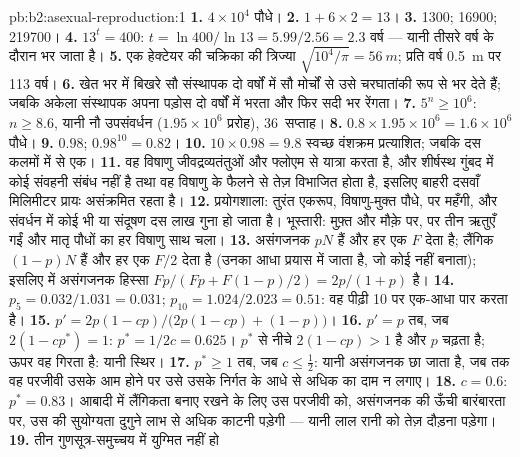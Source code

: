 \begin{solution}{pb:b2:asexual-reproduction:1}
\textbf{1.} $4\times 10^{4}$ पौधे।
\textbf{2.} $1 + 6\times 2 = 13$।
\textbf{3.} \num{1300}; \num{16900}; \num{219700}।
\textbf{4.} $13^{t} = 400$: $t = \ln 400/\ln 13 = 5.99/2.56 = 2.3$
वर्ष --- यानी तीसरे वर्ष के दौरान भर जाता है।
\textbf{5.} एक हेक्टेयर की चक्रिका की त्रिज्या $\sqrt{10^{4}/\pi} = \qty{56}{m}$;
प्रति वर्ष \qty{0.5}{m} पर \num{113} वर्ष।
\textbf{6.} खेत भर में बिखरे सौ संस्थापक दो वर्षों में सौ मोर्चों से
उसे चरघातांकी रूप से भर देते हैं; जबकि अकेला संस्थापक अपना पड़ोस दो
वर्षों में भरता और फिर सदी भर रेंगता।
\textbf{7.} $5^{n} \ge 10^{6}$: $n \ge 8.6$, यानी नौ उपसंवर्धन
($1.95\times 10^{6}$ प्ररोह), 36~सप्ताह।
\textbf{8.} $0.8\times 1.95\times 10^{6} = 1.6\times 10^{6}$ पौधे।
\textbf{9.} $0.98$; $0.98^{10} = 0.82$।
\textbf{10.} $10\times 0.98 = 9.8$ स्वच्छ वंशक्रम प्रत्याशित; जबकि दस
कलमों में से एक।
\textbf{11.} वह विषाणु जीवद्रव्यतंतुओं और फ्लोएम से यात्रा करता है,
और शीर्षस्थ गुंबद में कोई संवहनी संबंध नहीं है तथा वह विषाणु के फैलने से
तेज़ विभाजित होता है, इसलिए बाहरी दसवाँ मिलिमीटर प्रायः असंक्रमित रहता है।
\textbf{12.} प्रयोगशाला: तुरंत एकरूप, विषाणु-मुक्त पौधे, पर
महँगी, और संवर्धन में कोई भी  या संदूषण दस लाख गुना
हो जाता है। भूस्तारी: मुफ़्त और मौक़े पर, पर तीन
ऋतुएँ गईं और मातृ पौधों का हर विषाणु साथ चला।
\textbf{13.} असंगजनक $pN$ हैं और हर एक $F$  देता है; लैंगिक
$(1 - p)N$ हैं और हर एक $F/2$  देता है (उनका आधा प्रयास  में
जाता है, जो कोई  नहीं बनाता); इसलिए  में असंगजनक हिस्सा $Fp/(Fp + F(1 - p)/2)
= 2p/(1 + p)$ है।
\textbf{14.} $p_5 = 0.032/1.031 = 0.031$; $p_{10} = 1.024/2.023 =
0.51$: वह पीढ़ी 10 पर एक-आधा पार करता है।
\textbf{15.} $p' = 2p(1 - cp)/\bigl(2p(1 - cp) + (1 - p)\bigr)$।
\textbf{16.} $p' = p$ तब, जब $2(1 - cp^*) = 1$: $p^* = 1/2c = 0.625$।
$p^*$ से नीचे $2(1 - cp) > 1$ है और $p$ चढ़ता है; ऊपर वह गिरता है: यानी स्थिर।
\textbf{17.} $p^* \ge 1$ तब, जब $c \le \tfrac12$: यानी असंगजनक छा जाता
है, जब तक वह परजीवी उसके आम होने पर उसे उसके निर्गत के आधे से अधिक का दाम न लगाए।
\textbf{18.} $c = 0.6$: $p^* = 0.83$। आबादी में लैंगिकता बनाए रखने के
लिए उस परजीवी को, असंगजनक की ऊँची बारंबारता पर, उस  की
सुयोग्यता दुगुने लाभ से अधिक काटनी पड़ेगी --- यानी लाल रानी को
तेज़ दौड़ना पड़ेगा।
\textbf{19.} तीन गुणसूत्र-समुच्चय  में युग्मित नहीं हो

\end{solution}
